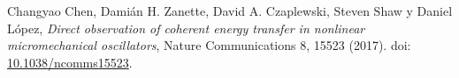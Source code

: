 
Changyao Chen, Damián H. Zanette, David A. Czaplewski, Steven Shaw y Daniel López,
\textit{Direct observation of coherent energy transfer in nonlinear micromechanical oscillators},
Nature Communications 8, 15523 (2017).
doi: \href{https://doi.org/10.1038/ncomms15523}{10.1038/ncomms15523}.
